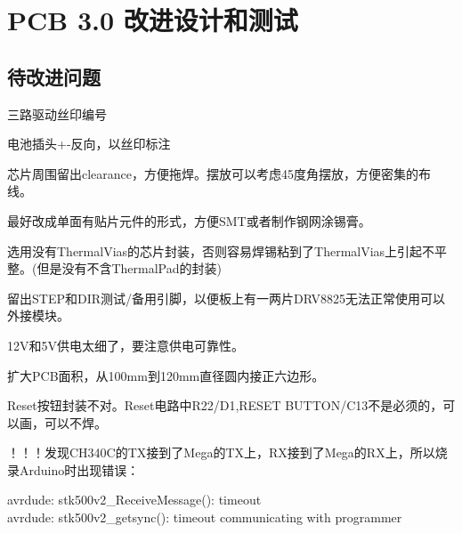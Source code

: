 \chapter{PCB 3.0 改进设计和测试}
\label{cha:PCB-v3}

\section{待改进问题}

三路驱动丝印编号

电池插头+-反向，以丝印标注

芯片周围留出clearance，方便拖焊。摆放可以考虑45度角摆放，方便密集的布线。

最好改成单面有贴片元件的形式，方便SMT或者制作钢网涂锡膏。

选用没有ThermalVias的芯片封装，否则容易焊锡粘到了ThermalVias上引起不平整。(但是没有不含ThermalPad的封装)

留出STEP和DIR测试/备用引脚，以便板上有一两片DRV8825无法正常使用可以外接模块。

12V和5V供电太细了，要注意供电可靠性。

扩大PCB面积，从100mm到120mm直径圆内接正六边形。

Reset按钮封装不对。Reset电路中R22/D1,RESET BUTTON/C13不是必须的，可以画，可以不焊。

！！！发现CH340C的TX接到了Mega的TX上，RX接到了Mega的RX上，所以烧录Arduino时出现错误：

\begin{tcolorbox}
    avrdude: stk500v2\_ReceiveMessage(): timeout \\
    avrdude: stk500v2\_getsync(): timeout communicating with programmer
\end{tcolorbox}
